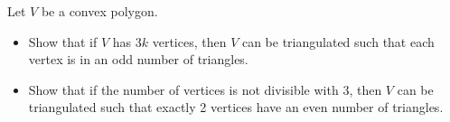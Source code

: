 Let \(V\) be a convex polygon.\begin{itemize}

\item[(a)] Show that if \(V\) has \(3k\) vertices, then \(V\) can be triangulated such that each vertex is in an odd number of triangles.
\item[(b)] Show that if the number of vertices is not divisible with 3, then \(V\) can be triangulated such that exactly 2 vertices have an even number of triangles.
\end{itemize}
